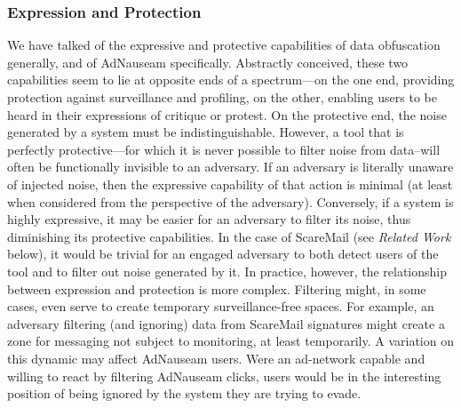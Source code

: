 \documentclass[conference]{IEEEtran}
\begin{document}

\subsubsection{Expression and Protection}

We have talked of the expressive and protective capabilities of data obfuscation generally, and of AdNauseam specifically. Abstractly conceived, these two capabilities seem to lie at opposite ends of a spectrum---on the one end, providing protection against surveillance and profiling, on the other, enabling users to be heard in their expressions of critique or protest. On the protective end, the noise generated by a system must be indistinguishable. However, a tool that is perfectly protective---for which it is never possible to filter noise from data--will often be functionally invisible to an adversary. If an adversary is literally unaware of injected noise, then the expressive capability of that action is minimal (at least when considered from the perspective of the adversary). Conversely, if a system is highly expressive, it may be easier for an adversary to filter its noise, thus diminishing its protective capabilities. In the case of ScareMail (see \emph{Related Work} below), it would be trivial for an engaged adversary to both detect users of the tool and to filter out noise generated by it. In practice, however, the relationship between expression and protection is more complex. Filtering might, in some cases, even serve to create temporary surveillance-free spaces. For example, an adversary filtering (and ignoring) data from ScareMail signatures might create a zone for messaging not subject to monitoring, at least temporarily. A variation on this dynamic may affect AdNauseam users. Were an ad-network capable and willing to react by filtering AdNauseam clicks, users would be in the interesting position of being ignored by the system they are trying to evade.
\end{document}
